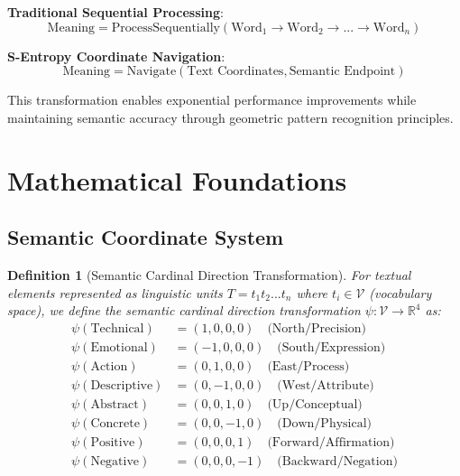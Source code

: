 \documentclass[12pt,a4paper]{article}
\newtheorem{definition}{Definition}
\begin{document}
\textbf{Traditional Sequential Processing}:
\begin{equation}
\text{Meaning} = \text{ProcessSequentially}(\text{Word}_1 \rightarrow \text{Word}_2 \rightarrow ... \rightarrow \text{Word}_n)
\end{equation}

\textbf{S-Entropy Coordinate Navigation}:
\begin{equation}
\text{Meaning} = \text{Navigate}(\text{Text Coordinates}, \text{Semantic Endpoint})
\end{equation}

This transformation enables exponential performance improvements while maintaining semantic accuracy through geometric pattern recognition principles.

\section{Mathematical Foundations}

\subsection{Semantic Coordinate System}

\begin{definition}[Semantic Cardinal Direction Transformation]
For textual elements represented as linguistic units $T = t_1t_2...t_n$ where $t_i \in \mathcal{V}$ (vocabulary space), we define the semantic cardinal direction transformation $\psi: \mathcal{V} \to \mathbb{R}^4$ as:
\begin{align}
\psi(\text{Technical}) &= (1, 0, 0, 0) \quad \text{(North/Precision)} \\
\psi(\text{Emotional}) &= (-1, 0, 0, 0) \quad \text{(South/Expression)} \\
\psi(\text{Action}) &= (0, 1, 0, 0) \quad \text{(East/Process)} \\
\psi(\text{Descriptive}) &= (0, -1, 0, 0) \quad \text{(West/Attribute)} \\
\psi(\text{Abstract}) &= (0, 0, 1, 0) \quad \text{(Up/Conceptual)} \\
\psi(\text{Concrete}) &= (0, 0, -1, 0) \quad \text{(Down/Physical)} \\
\psi(\text{Positive}) &= (0, 0, 0, 1) \quad \text{(Forward/Affirmation)} \\
\psi(\text{Negative}) &= (0, 0, 0, -1) \quad \text{(Backward/Negation)}
\end{align}
\end{definition}
\end{document}
